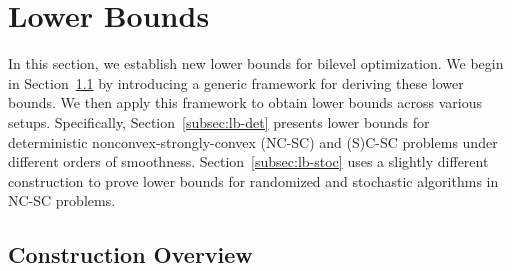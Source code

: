 \documentclass{article}
\begin{document}

\section{Lower Bounds} \label{sec:lb}

In this section, we establish new lower bounds for bilevel optimization. We begin in Section~\ref{subsec:framework} by introducing a generic framework for deriving these lower bounds. We then apply this framework to obtain lower bounds across various setups. Specifically, Section~\ref{subsec:lb-det} presents lower bounds for deterministic nonconvex-strongly-convex (NC-SC) and (S)C-SC problems under different orders of smoothness. Section~\ref{subsec:lb-stoc} 
uses a slightly different construction to prove lower bounds for 
randomized and stochastic algorithms in NC-SC problems.








\subsection{Construction Overview} \label{subsec:framework}
\end{document}
